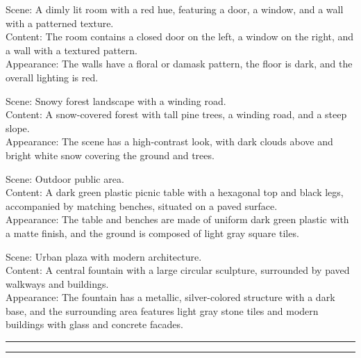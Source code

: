 \exampleDashedSep
\noindent Scene: A dimly lit room with a red hue, featuring a door, a window, and a wall with a patterned texture.\\
Content: The room contains a closed door on the left, a window on the right, and a wall with a textured pattern.\\
Appearance: The walls have a floral or damask pattern, the floor is dark, and the overall lighting is red.

\exampleDashedSep
\noindent Scene: Snowy forest landscape with a winding road.\\
Content: A snow-covered forest with tall pine trees, a winding road, and a steep slope.\\
Appearance: The scene has a high-contrast look, with dark clouds above and bright white snow covering the ground and trees.

\exampleDashedSep
\noindent Scene: Outdoor public area.\\
Content: A dark green plastic picnic table with a hexagonal top and black legs, accompanied by matching benches, situated on a paved surface.\\
Appearance: The table and benches are made of uniform dark green plastic with a matte finish, and the ground is composed of light gray square tiles.

\exampleDashedSep
\noindent Scene: Urban plaza with modern architecture.\\
Content: A central fountain with a large circular sculpture, surrounded by paved walkways and buildings.\\
Appearance: The fountain has a metallic, silver-colored structure with a dark base, and the surrounding area features light gray stone tiles and modern buildings with glass and concrete facades.

\endgroup

{
  \vspace{0.5em}
  \color{linegreen}
  \hrule
  \vspace{1pt}
  \hrule
  \vspace{1em}
}
